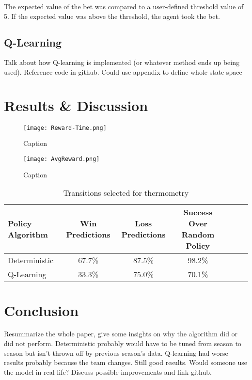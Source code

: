 \documentclass[conf]{new-aiaa}
\begin{document}
The expected value of the bet was compared to a user-defined threshold value of 5. If the expected value was above the threshold, the agent took the bet. 




\subsection{Q-Learning}
Talk about how Q-learning is implemented (or whatever method ends up being used). Reference code in github. Could use appendix to define whole state space

\section{Results \& Discussion}


\begin{figure}[h]
    \centering
    \texttt{[image: Reward-Time.png]}
    \caption{Caption}
    \label{fig:enter-label}
\end{figure}

\begin{figure}[h]
    \centering
    \texttt{[image: AvgReward.png]}
    \caption{Caption}
    \label{fig:enter-label}
\end{figure}

\begin{table}[h]
\caption{\label{tab:table1} Transitions selected for thermometry}
\centering
\begin{tabular}{lcccccc}
\hline
Policy Algorithm& Win Predictions & Loss Predictions& Success Over Random Policy\\\hline
Deterministic & 67.7\%& 87.5\%& 98.2\%\\
Q-Learning& 33.3\%& 75.0\%& 70.1\%\\
\hline
\end{tabular}
\end{table}

\section{Conclusion}
Resummarize the whole paper, give some insights on why the algorithm did or did not perform. Deterministic probably would have to be tuned from season to season but isn't thrown off by previous season's data. Q-learning had worse results probably because the team changes. Still good results. Would someone use the model in real life? Discuss possible improvements and link github.
\end{document}
